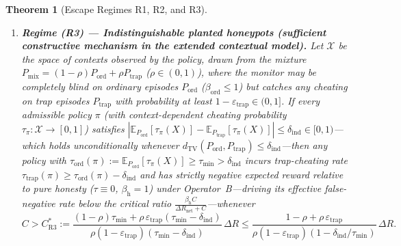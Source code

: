 \documentclass[11pt,a4paper]{article}
\newtheorem{theorem}{Theorem}
\newcommand{\E}{\mathbb{E}}
\newcommand{\dTV}{d_{\mathrm{TV}}}
\begin{document}
\begin{theorem}[Escape Regimes R1, R2, and R3]
\begin{enumerate}
  \item \textbf{Regime (R3) --- Indistinguishable planted honeypots (sufficient constructive mechanism in the extended contextual model).} Let $\mathcal{X}$ be the space of contexts observed by the policy, drawn from the mixture $P_{\mathrm{mix}} = (1-\rho)P_{\mathrm{ord}} + \rho P_{\mathrm{trap}}$ ($\rho \in (0, 1)$), where the monitor may be completely blind on ordinary episodes $P_{\mathrm{ord}}$ ($\beta_{\mathrm{ord}} \le 1$) but catches any cheating on trap episodes $P_{\mathrm{trap}}$ with probability at least $1 - \varepsilon_{\mathrm{trap}} \in (0, 1]$. If every admissible policy $\pi$ (with context-dependent cheating probability $\tau_{\pi} : \mathcal{X} \to [0, 1]$) satisfies $|\E_{P_{\mathrm{ord}}}[\tau_\pi(X)] - \E_{P_{\mathrm{trap}}}[\tau_\pi(X)]| \le \delta_{\mathrm{ind}} \in [0, 1)$---which holds unconditionally whenever $\dTV(P_{\mathrm{ord}}, P_{\mathrm{trap}}) \le \delta_{\mathrm{ind}}$---then any policy with $\tau_{\mathrm{ord}}(\pi) := \E_{P_{\mathrm{ord}}}[\tau_\pi(X)] \ge \tau_{\min} > \delta_{\mathrm{ind}}$ incurs trap-cheating rate $\tau_{\mathrm{trap}}(\pi) \ge \tau_{\mathrm{ord}}(\pi) - \delta_{\mathrm{ind}}$ and has strictly negative expected reward relative to pure honesty ($\tau \equiv 0$, $\beta_{\mathrm{h}} = 1$) under Operator~B---driving its effective false-negative rate below the critical ratio $\frac{\beta_{\mathrm{h}} C}{\Delta R_{\mathrm{net}} + C}$---whenever
  \begin{equation}\label{eq:R3}
    C > C_{\mathrm{R3}}^*
    := \frac{(1-\rho)\tau_{\min} + \rho\,\varepsilon_{\mathrm{trap}}(\tau_{\min} - \delta_{\mathrm{ind}})}{\rho(1 - \varepsilon_{\mathrm{trap}})(\tau_{\min} - \delta_{\mathrm{ind}})}\,\Delta R
    \le \frac{1 - \rho + \rho\,\varepsilon_{\mathrm{trap}}}{\rho(1 - \varepsilon_{\mathrm{trap}})(1 - \delta_{\mathrm{ind}}/\tau_{\min})}\,\Delta R.
  \end{equation}
\end{enumerate}
\end{theorem}
\end{document}
